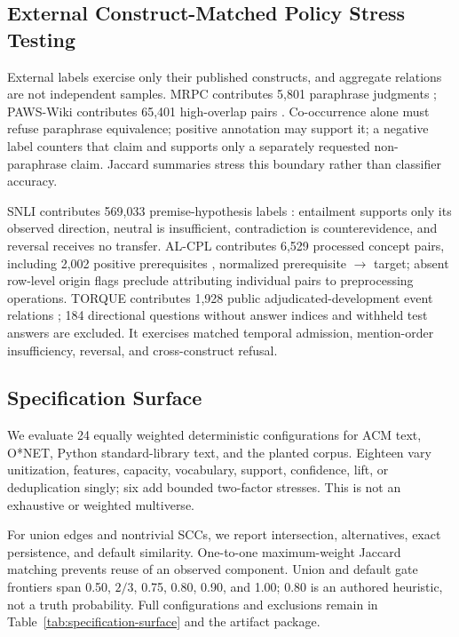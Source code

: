\documentclass[manuscript,screen,review]{acmart}
\begin{document}
\subsection{External Construct-Matched Policy Stress Testing}

External labels exercise only their published constructs, and aggregate relations are not independent samples. MRPC contributes 5,801 paraphrase judgments \cite{dolan2005}; PAWS-Wiki contributes 65,401 high-overlap pairs \cite{zhang2019}. Co-occurrence alone must refuse paraphrase equivalence; positive annotation may support it; a negative label counters that claim and supports only a separately requested non-paraphrase claim. Jaccard summaries stress this boundary rather than classifier accuracy.

SNLI contributes 569,033 premise-hypothesis labels \cite{bowman2015}: entailment supports only its observed direction, neutral is insufficient, contradiction is counterevidence, and reversal receives no transfer. AL-CPL contributes 6,529 processed concept pairs, including 2,002 positive prerequisites \cite{liang2018,wang2016}, normalized prerequisite $\rightarrow$ target; absent row-level origin flags preclude attributing individual pairs to preprocessing operations. TORQUE contributes 1,928 public adjudicated-development event relations \cite{ning2020}; 184 directional questions without answer indices and withheld test answers are excluded. It exercises matched temporal admission, mention-order insufficiency, reversal, and cross-construct refusal.

\subsection{Specification Surface}

We evaluate 24 equally weighted deterministic configurations for ACM text, O*NET, Python standard-library text, and the planted corpus. Eighteen vary unitization, features, capacity, vocabulary, support, confidence, lift, or deduplication singly; six add bounded two-factor stresses. This is not an exhaustive or weighted multiverse.

For union edges and nontrivial SCCs, we report intersection, alternatives, exact persistence, and default similarity. One-to-one maximum-weight Jaccard matching prevents reuse of an observed component. Union and default gate frontiers span 0.50, $2/3$, 0.75, 0.80, 0.90, and 1.00; 0.80 is an authored heuristic, not a truth probability. Full configurations and exclusions remain in Table~\ref{tab:specification-surface} and the artifact package.
\end{document}
